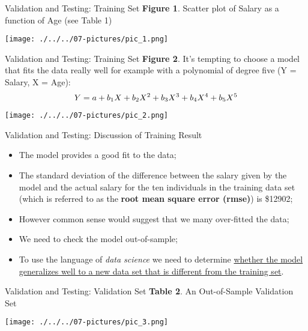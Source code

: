 \documentclass[11pt]{beamer}
\begin{document}
\begin{frame}{Validation and Testing: Training Set}
\textbf{Figure 1}. Scatter plot of Salary as a function of Age (see Table 1)
	\begin{center}
	\texttt{[image: ./../../07-pictures/pic\_1.png]}
	\end{center}
\end{frame}
\begin{frame}{Validation and Testing: Training Set}
\textbf{Figure 2}. It's tempting to choose a model that fits the data really well for example with a polynomial of degree five (Y = Salary, X = Age):
	\begin{equation}
	Y = a + b_1X+b_2X^2+b_3X^3+b_4X^4+b_5X^5 \notag
	\end{equation}	 
	\begin{center}
	\texttt{[image: ./../../07-pictures/pic\_2.png]}
	\end{center}
\end{frame}
\begin{frame}{Validation and Testing: Discussion of Training Result}
\begin{itemize}
\item The model provides a good fit to the data;
\item The standard deviation of the difference between the salary given by the model and the actual salary for the ten individuals in the training data set (which is referred to as the \textbf{root mean square error (rmse)}) is \$12902;
\item However common sense would suggest that we many over-fitted the data;
\item We need to check the model out-of-sample;
\item To use the language of \textit{data science} we need to determine \ul{whether the model generalizes well to a new data set that is different from the training set}.
\end{itemize}
\end{frame}
\begin{frame}{Validation and Testing: Validation Set}
\textbf {Table 2}. An Out-of-Sample Validation Set
	\begin{center}
	\texttt{[image: ./../../07-pictures/pic\_3.png]}
	\end{center}
\end{frame}
\end{document}
